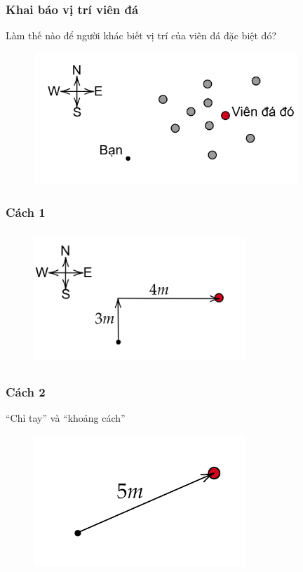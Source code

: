 \begin{frame}
\frametitle{Khai báo vị trí viên đá}
Làm thế nào để người khác biết vị trí của viên đá đặc biệt đó?
\begin{figure}[H]
    \centering
    \includegraphics[width=10cm, height=5cm]{Slides/Figure/thestone.png}
\end{figure}
\end{frame}
\begin{frame}
    \frametitle{Cách 1}
    \begin{figure}[H]
        \centering
        \includegraphics[width=8cm, height=5cm]{Slides/Figure/3m4m.png}
    \end{figure}
\end{frame}
\begin{frame}
    \frametitle{Cách 2}
    ``Chỉ tay'' và ``khoảng cách''
    \begin{figure}[H]
        \centering
        \includegraphics[width=8cm, height=5cm]{Slides/Figure/5m.png}
    \end{figure}
\end{frame}

